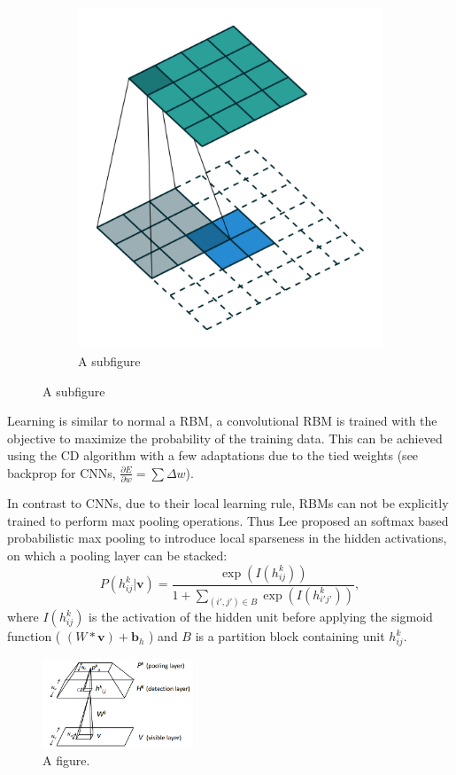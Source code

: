 \begin{figure}
\begin{subfigure}[t]{.30\textwidth}
  		\includegraphics[width=.8\linewidth]{imgs/crbm_padding2.png}
  		\caption{A subfigure}
  		\label{fig:sub3}
	\end{subfigure}
\end{figure}


Learning is similar to normal a RBM, a convolutional RBM is trained with the objective to maximize the probability of the training data.
This can be achieved using the CD algorithm with a few adaptations due to the tied weights (see backprop for CNNs, $\frac{\partial E}{\partial w} = \sum \Delta w$).

In contrast to CNNs, due to their local learning rule, RBMs can not be explicitly trained to perform max pooling operations.
Thus Lee proposed an softmax based probabilistic max pooling to introduce local sparseness in the hidden activations, on which a pooling layer can be stacked:
\[
P(h^k_{ij} | \textbf{v}) = \frac{\exp(I(h^k_{ij}))}{1 + \sum_{(i',j') \in B} \exp(I(h^k_{i'j'}))},
\]
where $I(h^k_{ij})$ is the activation of the hidden unit before applying the sigmoid function ( $(W * \textbf{v}) + \textbf{b}_{h}$ ) and $B$ is a partition block containing unit $h^k_{ij}$. 

\begin{figure}
	\centering
    	\includegraphics[width=0.4\textwidth]{imgs/prob_max_pool.png} 
    \caption{A figure.}
	\label{fig:test}
\end{figure}


